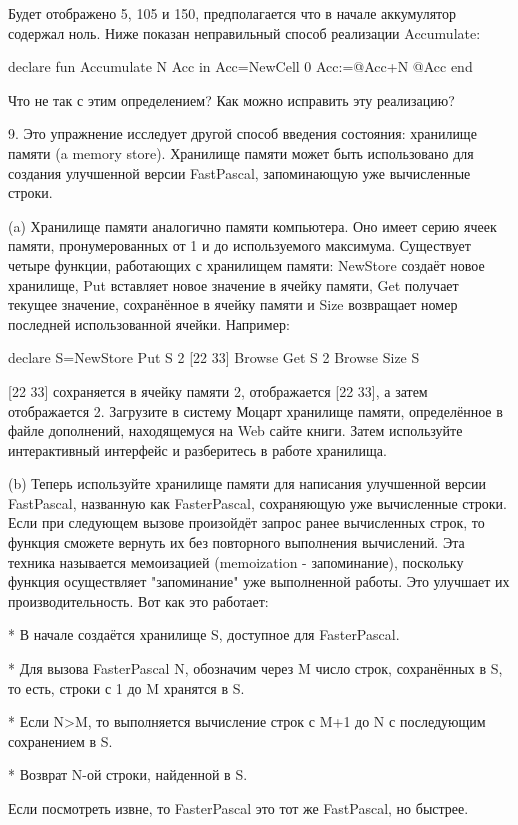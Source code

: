 Будет отображено 5, 105 и 150, предполагается что в начале аккумулятор содержал ноль. Ниже показан неправильный способ реализации Accumulate:

declare
fun {Accumulate N}
Acc in
Acc={NewCell 0}
Acc:=@Acc+N
@Acc
end

Что не так с этим определением? Как можно исправить эту реализацию?

9. Это упражнение исследует другой способ введения состояния: хранилище памяти (a memory store). Хранилище памяти может быть использовано для создания улучшенной версии FastPascal, запоминающую уже вычисленные строки.

(a) Хранилище памяти аналогично памяти компьютера. Оно имеет серию ячеек памяти, пронумерованных от 1 и до используемого максимума. Существует четыре функции, работающих с хранилищем памяти: NewStore создаёт новое хранилище, Put вставляет новое значение в ячейку памяти, Get получает текущее значение, сохранённое в ячейку памяти и Size возвращает номер последней использованной ячейки. Например:

declare
S={NewStore}
{Put S 2 [22 33]}
{Browse {Get S 2}}
{Browse {Size S}}

[22 33] сохраняется в ячейку памяти 2, отображается [22 33], а затем отображается 2. Загрузите в систему Моцарт хранилище памяти, определённое в файле дополнений, находящемуся на Web сайте книги. Затем используйте интерактивный интерфейс и разберитесь в работе хранилища.

(b) Теперь используйте хранилище памяти для написания улучшенной версии FastPascal, названную как FasterPascal, сохраняющую уже вычисленные строки. Если при следующем вызове произойдёт запрос ранее вычисленных строк, то функция сможете вернуть их без повторного выполнения вычислений. Эта техника называется мемоизацией (memoization - запоминание), поскольку функция осуществляет "запоминание" уже выполненной работы. Это улучшает их производительность. Вот как это работает:

* В начале создаётся хранилище S, доступное для FasterPascal.

* Для вызова {FasterPascal N}, обозначим через M число строк, сохранённых в S, то есть, строки с 1 до M хранятся в S.

* Если N>M, то выполняется вычисление строк с M+1 до N с последующим сохранением в S.

* Возврат N-ой строки, найденной в S.

Если посмотреть извне, то FasterPascal это тот же FastPascal, но быстрее.

